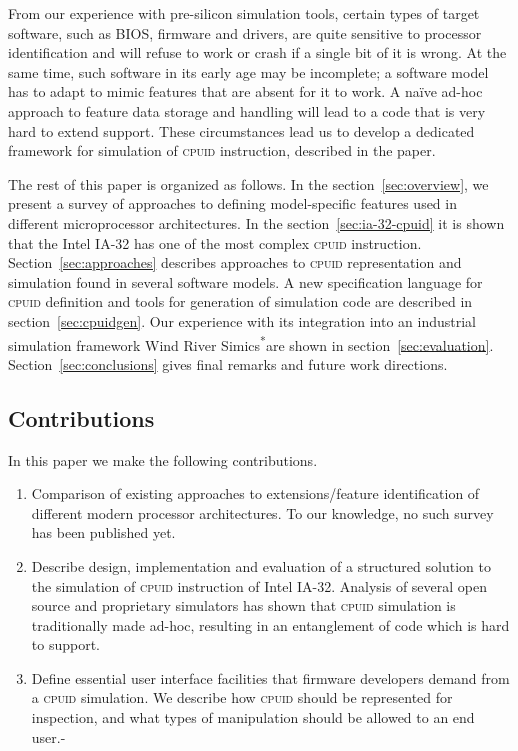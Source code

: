 \documentclass[a4paper,10pt,oneside,unicode]{article}
\newcommand{\cpuid}{\textsc{cpuid} }
\newcommand{\othercopyright}{\textsuperscript{*}}
\begin{document}
From our experience with pre-silicon simulation tools, certain types of target software, such as BIOS, firmware and drivers, are quite sensitive to processor identification and will refuse to work or crash if a single bit of it is wrong. At the same time, such software in its early age may be incomplete; a software model has to adapt to mimic features that are absent for it to work. A naïve ad-hoc approach to feature data storage and handling will lead to a code that is very hard to extend support. These circumstances lead us to develop a dedicated framework for simulation of \cpuid instruction, described in the paper.

The rest of this paper is organized as follows. In the section~\ref{sec:overview}, we present a survey of approaches to defining model-specific features used in different microprocessor architectures. In the section~\ref{sec:ia-32-cpuid} it is shown that the Intel IA-32 has one of the most complex \cpuid instruction. Section~\ref{sec:approaches} describes approaches to \cpuid representation and simulation found in several software models. A new specification language for \cpuid definition and tools for generation of simulation code are described in section~\ref{sec:cpuidgen}. Our experience with its integration  into an industrial simulation framework Wind River Simics\othercopyright are shown in section~\ref{sec:evaluation}. Section~\ref{sec:conclusions} gives final remarks and future work directions.

\subsection{Contributions}

In this paper we make the following contributions.
\begin{enumerate}
\item Comparison of existing approaches to extensions/feature identification of different modern processor architectures. To our knowledge, no such survey has been published yet.
\item Describe design, implementation and evaluation of a structured solution to the simulation of \cpuid instruction of Intel IA-32. Analysis of several open source and proprietary simulators has shown that \cpuid simulation is traditionally made ad-hoc, resulting in an entanglement of code which is hard to support.
\item Define essential user interface facilities that firmware developers demand from a \cpuid simulation. We describe how \cpuid should be represented for inspection, and what types of manipulation should be allowed to an end user.-
\end{enumerate}
\end{document}
